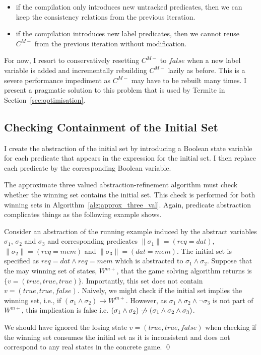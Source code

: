 \begin{itemize}
    \item if the compilation only introduces new untracked predicates, then we can keep the consistency relations from the previous iteration.
    \item if the compilation introduces new label predicates, then we cannot reuse $C^{M-}$ from the previous iteration without modification.
\end{itemize}

For now, I resort to conservatively resetting $C^{M-}$ to $false$ when a new label variable is added and incrementally rebuilding $C^{M-}$ lazily as before. This is a severe performance impediment as $C^{M-}$ may have to be rebuilt many times. I present a pragmatic solution to this problem that is used by Termite in Section~\ref{sec:optimisation}.

\subsection{Checking Containment of the Initial Set}
\label{sec:init_containment}

I create the abstraction of the initial set by introducing a Boolean state variable for each predicate that appears in the expression for the initial set. I then replace each predicate by the corresponding Boolean variable.

The approximate three valued abstraction-refinement algorithm must check whether the winning set contains the initial set. This check is performed for both winning sets in Algorithm~\ref{alg:approx_three_val}. Again, predicate abstraction complicates things as the following example shows.

\begin{ex}
    Consider an abstraction of the running example induced by the abstract variables $\sigma_1$, $\sigma_2$ and $\sigma_3$ and corresponding predicates $\|\sigma_1\| = (req=dat)$, $\|\sigma_2\| = (req=mem)$ and $\|\sigma_3\| = (dat=mem)$. The initial set is specified as $req=dat \land req=mem$ which is abstracted to $\sigma_1 \land \sigma_2$. Suppose that the may winning set of states, $W^{m+}$, that the game solving algorithm returns is $\{v=(true, true, true)\}$. Importantly, this set does not contain $v=(true, true, false)$. Naively, we might check if the initial set implies the winning set, i.e., if $(\sigma_1 \land \sigma_2) \rightarrow W^{m+}$. However, as $\sigma_1 \land \sigma_2 \land \neg\sigma_3$ is not part of $W^{m+}$, this implication is false i.e. $(\sigma_1 \land \sigma_2) \centernot\rightarrow (\sigma_1 \land \sigma_2 \land \sigma_3)$.

    We should have ignored the losing state $v=(true, true, false)$ when checking if the winning set consumes the initial set as it is inconsistent and does not correspond to any real states in the concrete game. 
    \qed
\end{ex}

